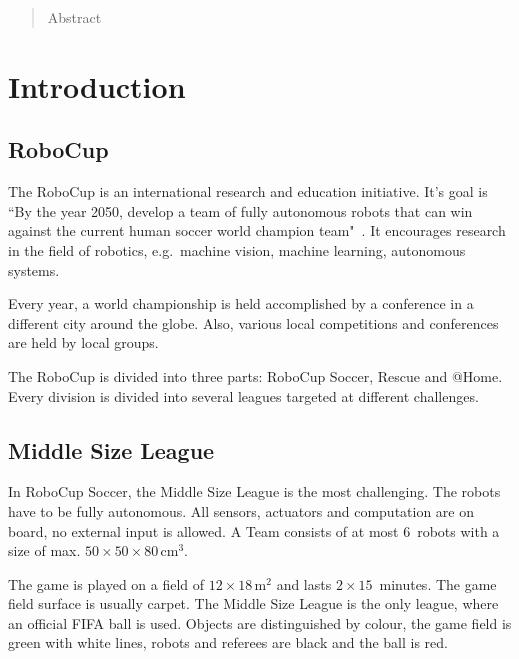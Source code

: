 \documentclass[12pt,a4paper]{article}
\newcommand{\MSL}{Middle Size League\xspace}
\begin{document}


\tableofcontents
\clearpage
\pagestyle{plain}


\begin{abstract}
Abstract

\end{abstract}

\clearpage

\section{Introduction}


\subsection{RoboCup}

The RoboCup is an international research and education initiative. 
It's goal is ``By the year 2050, develop a team of fully autonomous robots that can win against the current human soccer world champion team"~\cite{robocup.org}.
It encourages research in the field of robotics, e.g.\ machine vision, machine learning, autonomous systems.


Every year, a world championship is held accomplished by a conference in a different city around the globe.
Also, various local competitions and conferences are held by local groups.

The RoboCup is divided into three parts: RoboCup Soccer, Rescue and @Home.
Every division is divided into several leagues targeted at different challenges.


\subsection{\MSL}

In RoboCup Soccer, the \MSL is the most challenging.
The robots have to be fully autonomous.
All sensors, actuators and computation are on board, no external input is allowed.
A Team consists of at most 6~robots with a size of max. $50\times50\times80$\,cm$^3$.

The game is played on a field of $12\times18$\,m$^2$ and lasts $2\times15$~minutes.
The game field surface is usually carpet.
The \MSL is the only league, where an official FIFA ball is used.
Objects are distinguished by colour, the game field is green with white lines, robots and referees are black and the ball is red.
\end{document}
